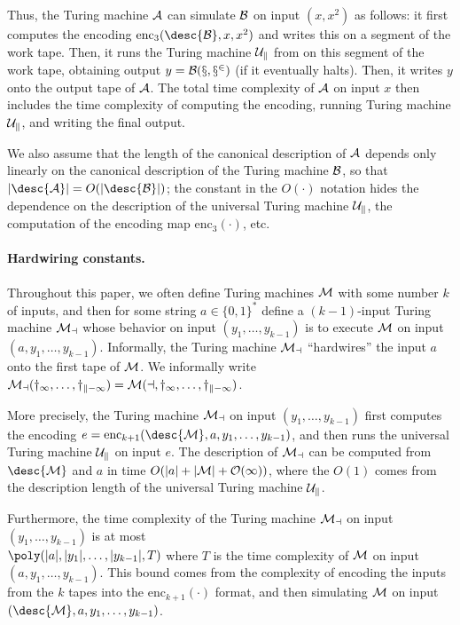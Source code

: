 Thus, the Turing machine $\cal{A}$ can simulate $\cal{B}$ on input $(x,x^2)$ as follows: it first computes
the encoding $\mathrm{enc}_3(\desc{\cal{B}},x,x^2)$ and writes this on a segment of the work tape. Then, it runs
the Turing machine $\cal{U}_k$ from  on this segment of the work tape, obtaining 
output $y = \cal{B}(x,x^2)$ (if it eventually halts). Then, it writes $y$ onto the output tape of
$\cal{A}$. The total time complexity of $\cal{A}$ on input $x$ then includes the time complexity 
of computing the encoding, running Turing machine $\cal{U}_k$, and writing the final output. 

We also assume that the length of the canonical description of $\cal{A}$ 
depends only linearly on the canonical description of the Turing machine $\cal{B}$, so that
$|\desc{\cal{A}}| = O(|\desc{\cal{B}}|)$; the constant in the $O(\cdot)$ notation hides
the dependence on the description of the universal Turing machine $\cal{U}_k$, the computation
of the encoding map $\mathrm{enc}_3(\cdot)$, etc. 






\paragraph{Hardwiring constants.} 
Throughout this paper, we often define Turing machines $\cal{M}$
with some number $k$ of inputs, and then for some string $a \in \{0,1\}^*$
define a $(k-1)$-input Turing machine $\cal{M}_a$ whose behavior on input
$(y_1,\ldots,y_{k-1})$ is to execute $\cal{M}$ on input
$(a,y_1,\ldots,y_{k-1})$.
Informally, the Turing machine $\cal{M}_a$ ``hardwires'' the input $a$ onto the
first tape of $\cal{M}$.
We  informally write $\cal{M}_a(y_1,\ldots,y_{k-1}) =
\cal{M}(a,y_1,\ldots,y_{k-1})$.

More precisely, the Turing machine $\cal{M}_a$ on input $(y_1,\ldots,y_{k-1})$ first
computes the encoding $e = \mathrm{enc}_{k+1}(\desc{\cal{M}},a,y_1,\ldots,y_{k-1})$, and then runs the
universal Turing machine $\cal{U}_k$ on input $e$.
The description of $\cal{M}_a$ can be computed from $\desc{\cal{M}}$ and $a$ in
time $O(|a| + |\cal{M}| + O(1))$, where the $O(1)$ comes from the description
length of the universal Turing machine $\cal{U}_k$.

Furthermore, the time complexity of the Turing machine $\cal{M}_a$ on input
$(y_1,\ldots,y_{k-1})$ is at most \\ $\poly(|a|,|y_1|,\ldots,|y_{k-1}|,T)$ where $T$
is the time complexity of $\cal{M}$ on input $(a,y_1,\ldots,y_{k-1})$.
This bound comes from the complexity of encoding the inputs from the $k$ tapes
into the $\mathrm{enc}_{k+1}(\cdot)$ format, and then simulating $\cal{M}$ on input
$(\desc{\cal{M}},a,y_1,\ldots,y_{k-1})$.



